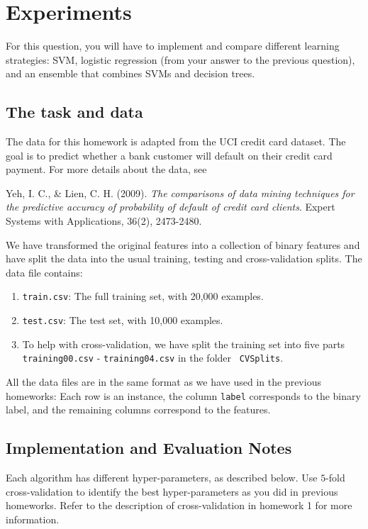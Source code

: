 \section{Experiments}\label{sec:experiments}

For this question, you will have to implement and compare different learning
strategies: SVM, logistic regression (from your answer to the previous
question), and an ensemble that combines SVMs and decision trees.

\subsection{The task and data}

The data for this homework is adapted from the UCI credit card dataset. The goal
is to predict whether a bank customer will default on their credit card
payment. For more details about the data, see

\noindent Yeh, I. C., \& Lien, C. H. (2009). {\em The comparisons of data mining
  techniques for the predictive accuracy of probability of default of credit
  card clients}. Expert Systems with Applications, 36(2), 2473-2480.

We have transformed the original features into a collection of binary features
and have split the data into the usual training, testing and cross-validation
splits. The data file contains:

\begin{enumerate}
\item {\tt train.csv}: The full training set, with 20,000 examples.
\item {\tt test.csv}: The test set, with 10,000 examples.
\item To help with cross-validation, we have split the training set into five
  parts {\tt training00.csv} - {\tt training04.csv} in the folder {\tt
    CVSplits}.
\end{enumerate}

All the data files are in the same format as we have used in the previous
homeworks: Each row is an instance, the column \texttt{label} corresponds to the
binary label, and the remaining columns correspond to the features.

\subsection{Implementation and Evaluation Notes}

Each algorithm has different hyper-parameters, as described below.  Use $5$-fold
cross-validation to identify the best hyper-parameters as you did in previous
homeworks. Refer to the description of cross-validation in homework 1 for more
information.

